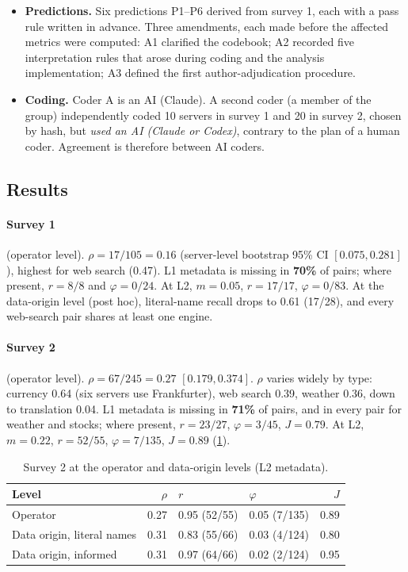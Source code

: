 \begin{itemize}
  \item \textbf{Predictions.} Six predictions P1--P6 derived from survey 1, each with a pass rule written in advance. Three amendments, each made before the affected metrics were computed: A1 clarified the codebook; A2 recorded five interpretation rules that arose during coding and the analysis implementation; A3 defined the first author-adjudication procedure.
  \item \textbf{Coding.} Coder A is an AI (Claude). A second coder (a member of the group) independently coded 10 servers in survey 1 and 20 in survey 2, chosen by hash, but \emph{used an AI (Claude or Codex)}, contrary to the plan of a human coder. Agreement is therefore between AI coders.
\end{itemize}

\subsection{Results}

\paragraph{Survey 1} (operator level). $\rho = 17/105 = 0.16$ (server-level bootstrap 95\% CI $[0.075,0.281]$), highest for web search (0.47). L1 metadata is missing in \textbf{70\%} of pairs; where present, $r=8/8$ and $\varphi=0/24$. At L2, $m=0.05$, $r=17/17$, $\varphi=0/83$. At the data-origin level (post hoc), literal-name recall drops to 0.61 (17/28), and every web-search pair shares at least one engine.

\paragraph{Survey 2} (operator level). $\rho = 67/245 = 0.27$ $[0.179,0.374]$. $\rho$ varies widely by type: currency 0.64 (six servers use Frankfurter), web search 0.39, weather 0.36, down to translation 0.04. L1 metadata is missing in \textbf{71\%} of pairs, and in every pair for weather and stocks; where present, $r=23/27$, $\varphi=3/45$, $J=0.79$. At L2, $m=0.22$, $r=52/55$, $\varphi=7/135$, $J=0.89$ (\cref{tab:origin}).

\begin{table}[t]
\centering
\caption{Survey 2 at the operator and data-origin levels (L2 metadata).}
\label{tab:origin}
\begin{tabular}{lrllr}
\toprule
Level & $\rho$ & $r$ & $\varphi$ & $J$ \\
\midrule
Operator & 0.27 & 0.95 (52/55) & 0.05 (7/135) & 0.89 \\
Data origin, literal names & 0.31 & 0.83 (55/66) & 0.03 (4/124) & 0.80 \\
Data origin, informed & 0.31 & 0.97 (64/66) & 0.02 (2/124) & 0.95 \\
\bottomrule
\end{tabular}
\end{table}

